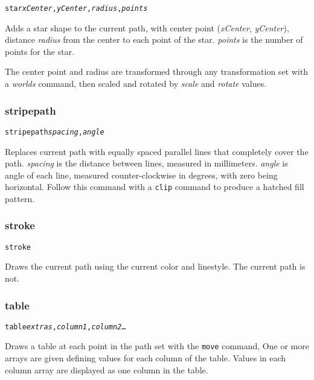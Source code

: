 \begin{alltt}
star \textit{xCenter}, \textit{yCenter}, \textit{radius}, \textit{points}
\end{alltt}

Adds a star shape to the current path, with center
point (\textit{xCenter}, \textit{yCenter}), distance
\textit{radius}
from the center to each point of the star.
\textit{points} is the number of points for the star.

The center point and radius are transformed through any
transformation set with a \textit{worlds} command,
then scaled and rotated by \textit{scale}
and \textit{rotate} values.

\subsubsection{stripepath}

\begin{alltt}
stripepath \textit{spacing}, \textit{angle}
\end{alltt}

Replaces current path with equally spaced parallel lines that completely cover
the path.  \textit{spacing} is the distance between lines, measured in
millimeters.  \textit{angle} is angle of each line, measured
counter-clockwise in degrees, with zero being horizontal.  Follow this command
with a \texttt{clip} command to produce a hatched fill pattern.

\subsubsection{stroke}

\begin{alltt}
stroke
\end{alltt}

Draws the current path using the current color and linestyle.
The current path is not.

\subsubsection{table}

\begin{alltt}
table \textit{extras}, \textit{column1}, \textit{column2} \dots
\end{alltt}

Draws a table at each point in the path set with the \texttt{move} command,
One or more arrays are given defining values for each column of the table.
Values in each column array are displayed as one column in the table.

